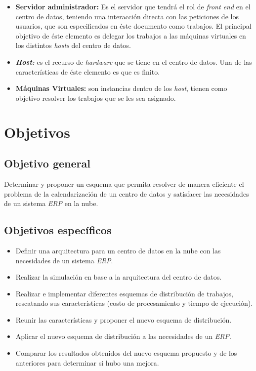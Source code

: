 \begin{itemize}
	\item \textbf{Servidor administrador:} Es el servidor que tendr\'a el rol de \textit{front end} en el centro de datos, teniendo una interacci\'on directa con las peticiones de los usuarios, que son especificados en \'este documento como trabajos.
	El principal objetivo de \'este elemento es delegar los trabajos a las m\'aquinas virtuales en los distintos \textit{hosts} del centro de datos.
	\item \textit{\textbf{Host:}} es el recurso de \textit{hardware} que se tiene en el centro de datos. Una de las caracter\'isticas de \'este elemento es que es finito.
	\item \textbf{M\'aquinas Virtuales:} son instancias dentro de los \textit{host}, tienen como objetivo resolver los trabajos que se les sea asignado.
\end{itemize}


\newpage

\section*{Objetivos}


\subsection*{Objetivo general}


Determinar y proponer un esquema que permita resolver de manera eficiente el problema de la calendarizaci\'on de un centro de datos y satisfacer las necesidades de un sistema \textit{ERP} en la nube.


\subsection*{Objetivos espec\'ificos}


\begin{itemize}
	\item Definir una arquitectura para un centro de datos en la nube con las necesidades de un sistema \textit{ERP}.
	\item Realizar la simulaci\'on en base a la arquitectura del centro de datos.
	\item Realizar e implementar diferentes esquemas de distribuci\'on de trabajos, rescatando sus caracter\'isticas (costo de procesamiento y tiempo de ejecución).
	\item Reunir las caracter\'isticas y proponer el nuevo esquema de distribuci\'on.
	\item Aplicar el nuevo esquema de distribuci\'on a las necesidades de un \textit{ERP}.
	\item Comparar los resultados obtenidos del nuevo esquema propuesto y de los anteriores para determinar si hubo una mejora.
\end{itemize}


